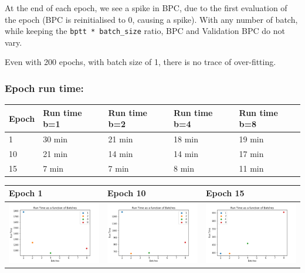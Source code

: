 At the end of each epoch, we see a spike in BPC, due to the first
evaluation of the epoch (BPC is reinitialised to 0, causing a spike).
With any number of batch, while keeping the
\lstinline!bptt * batch_size! ratio, BPC and Validation BPC do not vary.

Even with 200 epochs, with batch size of 1, there is no trace of
over-fitting.

\subsubsection{Epoch run time:}

\begin{longtable}[]{@{}lllll@{}}
\hline
Epoch & Run time b=1 & Run time b=2 & Run time b=4 & Run time
b=8\tabularnewline
\hline
\endhead
1 & 30 min & 21 min & 18 min & 19 min\tabularnewline
10 & 21 min & 14 min & 14 min & 17 min\tabularnewline
15 & 7 min & 7 min & 8 min & 11 min\tabularnewline
\hline
\end{longtable}

\begin{longtable}[]{@{}lll@{}}
\hline
Epoch 1 & Epoch 10 & Epoch 15\tabularnewline
\hline
\endhead
\includegraphics[width=.31\textwidth]{parts/appendix/reports-gmsnn/docs_esteban-latex/test_reports/2018-06-19/b1a8_batch_epoch_1.png} &
\includegraphics[width=.31\textwidth]{parts/appendix/reports-gmsnn/docs_esteban-latex/test_reports/2018-06-19/b1a8_batch_epoch_10.png} &
\includegraphics[width=.31\textwidth]{parts/appendix/reports-gmsnn/docs_esteban-latex/test_reports/2018-06-19/b1a8_batch_epoch_15.png}\tabularnewline
\hline
\end{longtable}


